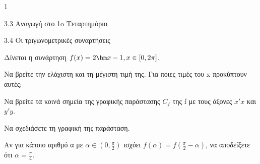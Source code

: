 \begin{ylh}{1}
\item 3.3 Αναγωγή στο 1o Τεταρτημόριο
\item 3.4 Οι τριγωνομετρικές συναρτήσεις
\end{ylh}
Δίνεται η συνάρτηση $f(x) = 2\hm  x - 1, x \in [0, 2\pi]$.
\begin{alist}
\item Να βρείτε την ελάχιστη και τη μέγιστη τιμή της. Για ποιες τιμές του x προκύπτουν αυτές;
\item Να βρείτε τα κοινά σημεία της γραφικής παράστασης $C_f$ της f με τους άξονες $x'x$ και $y'y$.
\item Να σχεδιάσετε τη γραφική της παράσταση.
\item Αν για κάποιο αριθμό α με $\alpha \in \left(0, \frac{\pi}{2}\right)$ ισχύει $f(\alpha) = f\left(\frac{\pi}{2} - \alpha\right)$, να αποδείξετε ότι $\alpha = \frac{\pi}{4}$.
\end{alist}

